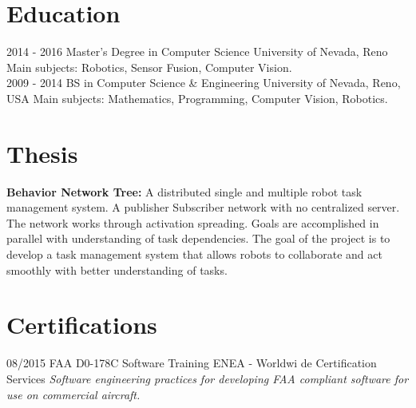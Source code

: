 \documentclass[]{friggeri-cv}
\begin{document}
\section{Education}
\begin{entrylist}
  \entry
    {2014 - 2016}
    {Master's Degree in Computer Science}
    {University of Nevada, Reno}
    {Main subjects: Robotics, Sensor Fusion, Computer Vision.\\}
  \entry
    {2009 - 2014}
    {BS in Computer Science \& Engineering}
    {University of Nevada, Reno, USA}
    {Main subjects: Mathematics, Programming, Computer Vision, Robotics.\\}
\end{entrylist}

\section{Thesis}
{\textbf{Behavior Network Tree:}}
{A distributed single and multiple robot task management system. A publisher Subscriber network with no centralized server. The network works through activation spreading. Goals are accomplished in parallel with understanding of task dependencies. The goal of the project is to develop a task management system that allows robots to collaborate and act smoothly with better understanding of tasks.}

\section{Certifications}
\begin{entrylist}
  \entry
    {08/2015}
    {FAA D0-178C Software Training}
    {ENEA - Worldwi de Certification Services}
    {\emph{Software engineering practices for developing FAA compliant software for use on commercial aircraft.}}
\end{entrylist}

\end{document}
